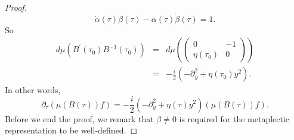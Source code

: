 \documentclass[reqno]{amsart}
\theoremstyle{plain}
\numberwithin{equation}{section}
\begin{document}
\begin{proof}
\begin{equation*}
\dot{\alpha}(\tau )\beta (\tau )-\alpha (\tau )\dot{\beta}(\tau )=1.
\end{equation*}So\begin{eqnarray*}
d\mu (B^{\prime }(\tau _{0})B^{-1}\left( \tau _{0}\right) ) &=&d\mu \left( 
\begin{pmatrix}
0 & -1 \\ 
\eta (\tau _{0}) & 0\end{pmatrix}\right) \\
&=&-\frac{i}{2}\left( -\partial _{y}^{2}+\eta (\tau _{0})y^{2}\right) .
\end{eqnarray*}In other words,\begin{equation*}
\partial _{\tau }\left( \mu \left( B\left( \tau \right) \right) f\right) =-\frac{i}{2}\left( -\partial _{y}^{2}+\eta (\tau )y^{2}\right) \left( \mu
\left( B\left( \tau \right) \right) f\right) .
\end{equation*}Before we end the proof, we remark that $\beta \neq 0$ is required for the
metaplectic representation to be well-defined.
\end{proof}
\end{document}
